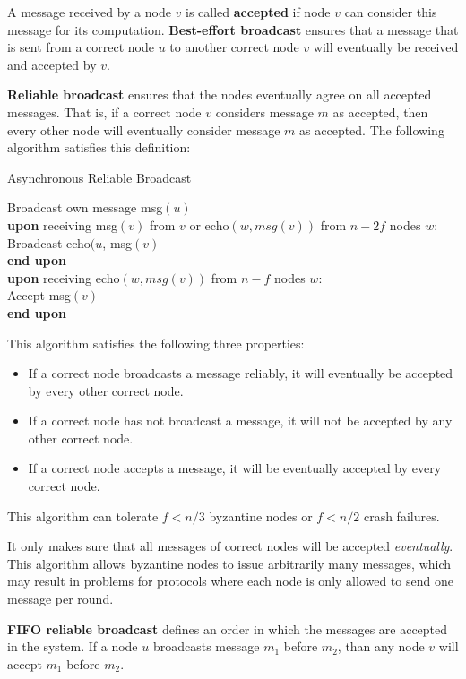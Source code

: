 A message received by a node $v$ is called \textbf{accepted} if node $v$ can consider this message for its computation. \textbf{Best-effort broadcast} ensures that a message that is sent from a correct node $u$ to another correct node $v$ will eventually be received and accepted by $v$. \medskip

\textbf{Reliable broadcast} ensures that the nodes eventually agree on all accepted messages. That is, if a correct node $v$ considers message $m$ as accepted, then every other node will eventually consider message $m$ as accepted. The following algorithm satisfies this definition: \medskip

\begin{algorithm}[H]
\caption{Asynchronous Reliable Broadcast}
	Broadcast own message msg$(u)$ \\
	\textbf{upon} receiving msg$(v)$ from $v$ or echo$(w, msg(v))$ from $n - 2f$ nodes $w$: \\
	Broadcast echo$(u$, msg$(v)$\\
	\textbf{end upon} \\
	
	\textbf{upon} receiving echo$(w, msg(v))$ from $n - f$ nodes $w$: \\
	Accept msg$(v)$\\
	\textbf{end upon}
\end{algorithm}
\medskip

This algorithm satisfies the following three properties:
\begin{itemize}
	\item If a correct node broadcasts a message reliably, it will eventually be accepted by every other correct node.
	\item If a correct node has not broadcast a message, it will not be accepted by any other correct node.
	\item If a correct node accepts a message, it will be eventually accepted by every correct node.
\end{itemize}

This algorithm can tolerate $f < n/3$ byzantine nodes or $f < n/2$ crash failures. \medskip

It only makes sure that all messages of correct nodes will be accepted \textit{eventually}. This algorithm allows byzantine nodes to issue arbitrarily many messages, which may result in problems for protocols where each node is only allowed to send one message per round. \medskip

\textbf{FIFO reliable broadcast} defines an order in which the messages are accepted in the system. If a node $u$ broadcasts message $m_1$ before $m_2$, than any node $v$ will accept $m_1$ before $m_2$. \medskip

